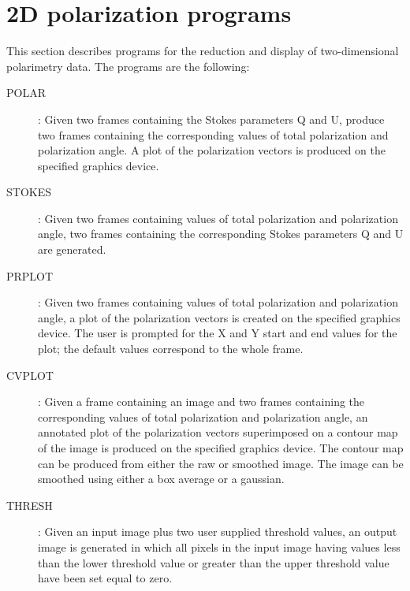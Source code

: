 \section {2D polarization programs}

This section describes programs for the reduction and display of two-dimensional
polarimetry data.
The programs are the following:
\begin{description}
\item [POLAR]:
Given two frames containing the Stokes parameters Q and U, produce
two frames containing the corresponding values of total polarization and
polarization angle.
A plot of the polarization vectors is produced on the specified graphics device.
\item [STOKES]:
Given two frames containing values of total polarization and polarization angle,
two frames containing the corresponding Stokes parameters Q and U are generated.
\item [PRPLOT]:
Given two frames containing values of total polarization and polarization angle,
a plot of the polarization vectors is created on the specified graphics device.
The user is prompted for the X and Y start and end values for the plot; the
default values correspond to the whole frame.
\item [CVPLOT]:
Given a frame containing an image and two frames containing the corresponding
values of total polarization and polarization angle, an annotated plot of
the polarization vectors superimposed on a contour map of the image is produced
on the specified graphics device.
The contour map can be produced from either the raw or smoothed image.
The image can be smoothed using either a box average or a gaussian.
\item [THRESH]:
Given an input image plus two user supplied threshold values, an output image is
generated in which all pixels in the input image having values less than the
lower threshold value or greater than the upper threshold value have been set
equal to zero.
\end{description}
